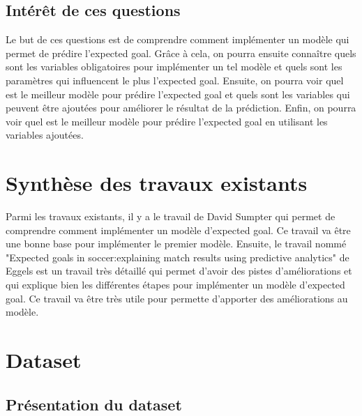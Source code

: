 \documentclass[12pt]{article}
\begin{document}
\subsection{Intérêt de ces questions}
\noindent Le but de ces questions est de comprendre comment implémenter un modèle qui permet de prédire l'expected goal. Grâce à cela, on pourra ensuite connaître quels sont les variables obligatoires pour implémenter un tel modèle et quels sont les paramètres qui influencent le plus l'expected goal. Ensuite, on pourra voir quel est le meilleur modèle pour prédire l'expected goal et quels sont les variables qui peuvent être ajoutées pour améliorer le résultat de la prédiction. Enfin, on pourra voir quel est le meilleur modèle pour prédire l'expected goal en utilisant les variables ajoutées.
\section{Synthèse des travaux existants}
\label{sec:synthese}
\noindent Parmi les travaux existants, il y a le travail de David Sumpter \cite{sumpterFittingXGModel} qui permet de comprendre comment implémenter un modèle d'expected goal. Ce travail va être une bonne base pour implémenter le premier modèle.
\newline
\noindent Ensuite, le travail nommé "Expected goals in soccer:explaining match results using predictive analytics" de Eggels \cite{eggelsExpectedGoalsSoccer2016} est un travail très détaillé qui permet d'avoir des pistes d'améliorations et qui explique bien les différentes étapes pour implémenter un modèle d'expected goal. Ce travail va être très utile pour permette d'apporter des améliorations au modèle.

\section{Dataset}

\subsection{Présentation du dataset}
\end{document}
